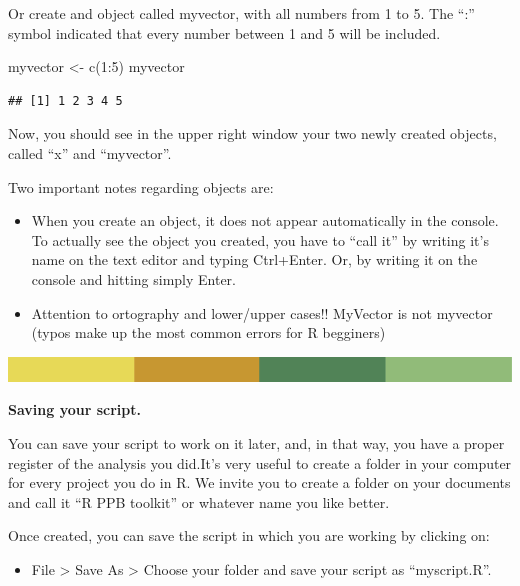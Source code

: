 \documentclass[
]{book}
\newenvironment{Shaded}{\begin{snugshade}}{\end{snugshade}}
\newcommand{\DecValTok}[1]{\textcolor[rgb]{0.00,0.00,0.81}{#1}}
\newcommand{\FunctionTok}[1]{\textcolor[rgb]{0.00,0.00,0.00}{#1}}
\newcommand{\NormalTok}[1]{#1}
\newcommand{\OtherTok}[1]{\textcolor[rgb]{0.56,0.35,0.01}{#1}}
\newcommand{\SpecialCharTok}[1]{\textcolor[rgb]{0.00,0.00,0.00}{#1}}
\providecommand{\tightlist}{%
  \setlength{\itemsep}{0pt}\setlength{\parskip}{0pt}}
\begin{document}
Or create and object called myvector, with all numbers from 1 to 5. The ``:'' symbol indicated that every number between 1 and 5 will be included.

\begin{Shaded}
\begin{Highlighting}[]
\NormalTok{myvector }\OtherTok{\textless{}{-}} \FunctionTok{c}\NormalTok{(}\DecValTok{1}\SpecialCharTok{:}\DecValTok{5}\NormalTok{)}
\NormalTok{myvector}
\end{Highlighting}
\end{Shaded}

\begin{verbatim}
## [1] 1 2 3 4 5
\end{verbatim}

Now, you should see in the upper right window your two newly created objects, called ``x'' and ``myvector''.

Two important notes regarding objects are:

\begin{itemize}
\item
  When you create an object, it does not appear automatically in the console. To actually see the object you created, you have to ``call it'' by writing it's name on the text editor and typing Ctrl+Enter. Or, by writing it on the console and hitting simply Enter.
\item
  Attention to ortography and lower/upper cases!! MyVector is not myvector (typos make up the most common errors for R begginers)
\end{itemize}

\includegraphics{rsrstrip.png}

\textbf{Saving your script.}

You can save your script to work on it later, and, in that way, you have a proper register of the analysis you did.It's very useful to create a folder in your computer for every project you do in R. We invite you to create a folder on your documents and call it ``R PPB toolkit'' or whatever name you like better.

Once created, you can save the script in which you are working by clicking on:

\begin{itemize}
\tightlist
\item
  File \textgreater{} Save As \textgreater{} Choose your folder and save your script as ``myscript.R''.
\end{itemize}
\end{document}
